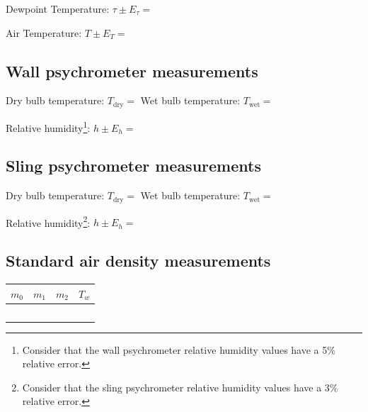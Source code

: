 \documentclass{article}
\begin{document}
\vspace{5mm}

Dewpoint Temperature: $\tau \pm E_\tau = $ \underline{\hspace{4cm}}

\vspace{5mm}

Air Temperature: $T \pm E_T = $ \underline{\hspace{4cm}}


\subsection{Wall psychrometer measurements}

Dry bulb temperature: $T_{\mbox{dry}}=$ \underline{\hspace{3cm}}  \hspace{1cm}
Wet bulb temperature: $T_{\mbox{wet}}=$ \underline{\hspace{3cm}}

\vspace{5mm}

Relative humidity\footnote{Consider that the wall psychrometer relative humidity values have a 5\% relative error.}: $h \pm E_h= $\underline{\hspace{3cm}}


\subsection{Sling psychrometer measurements}

Dry bulb temperature: $T_{\mbox{dry}}=$ \underline{\hspace{3cm}}  \hspace{1cm}
Wet bulb temperature: $T_{\mbox{wet}}=$ \underline{\hspace{3cm}}

\vspace{5mm}

Relative humidity\footnote{Consider that the sling psychrometer relative humidity values have a 3\% relative error.}: $h \pm E_h = $\underline{\hspace{3cm}}


\subsection{Standard air density measurements}


\begin{tabular}{|c|c|c|c|}
\hline
$m_0$&$m_1$&$m_2$&$T_w$\\
\hline
~\hspace{2.5cm}~&~\hspace{2.5cm}~&~\hspace{2.5cm}~&~\hspace{2.5cm}~\\
\hline
\end{tabular}
\end{document}
